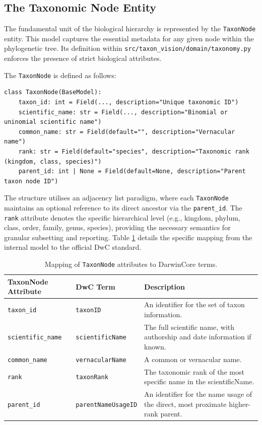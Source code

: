 \subsection{The Taxonomic Node Entity}
The fundamental unit of the biological hierarchy is represented by the \texttt{TaxonNode} entity. This model captures the essential metadata for any given node within the phylogenetic tree. Its definition within \texttt{src/taxon\_vision/domain/taxonomy.py} enforces the presence of strict biological attributes.

The \texttt{TaxonNode} is defined as follows:

\begin{verbatim}
class TaxonNode(BaseModel):
    taxon_id: int = Field(..., description="Unique taxonomic ID")
    scientific_name: str = Field(..., description="Binomial or uninomial scientific name")
    common_name: str = Field(default="", description="Vernacular name")
    rank: str = Field(default="species", description="Taxonomic rank (kingdom, class, species)")
    parent_id: int | None = Field(default=None, description="Parent taxon node ID")
\end{verbatim}

The structure utilises an adjacency list paradigm, where each \texttt{TaxonNode} maintains an optional reference to its direct ancestor via the \texttt{parent\_id}. The \texttt{rank} attribute denotes the specific hierarchical level (e.g., kingdom, phylum, class, order, family, genus, species), providing the necessary semantics for granular subsetting and reporting. Table \ref{tab:darwincore_mapping} details the specific mapping from the internal model to the official DwC standard.

\begin{table}[h]
\centering
\begin{tabularx}{\textwidth}{@{}llX@{}}
\toprule
\textbf{TaxonNode Attribute} & \textbf{DwC Term} & \textbf{Description} \\
\midrule
\texttt{taxon\_id} & \texttt{taxonID} & An identifier for the set of taxon information. \\
\texttt{scientific\_name} & \texttt{scientificName} & The full scientific name, with authorship and date information if known. \\
\texttt{common\_name} & \texttt{vernacularName} & A common or vernacular name. \\
\texttt{rank} & \texttt{taxonRank} & The taxonomic rank of the most specific name in the scientificName. \\
\texttt{parent\_id} & \texttt{parentNameUsageID} & An identifier for the name usage of the direct, most proximate higher-rank parent. \\
\bottomrule
\end{tabularx}
\caption{Mapping of \texttt{TaxonNode} attributes to DarwinCore terms.}
\label{tab:darwincore_mapping}
\end{table}

